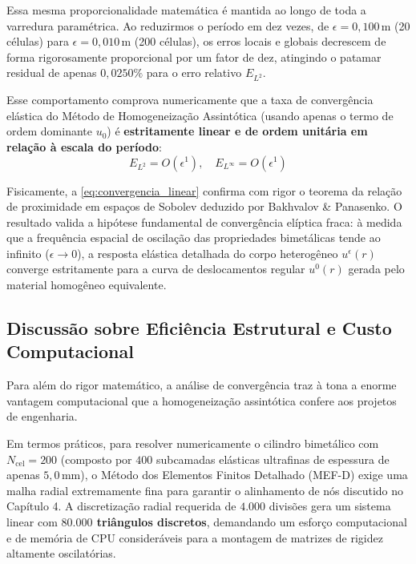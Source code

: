 Essa mesma proporcionalidade matemática é mantida ao longo de toda a varredura paramétrica. Ao reduzirmos o período em dez vezes, de $\epsilon = 0,100 \, \text{m}$ (20 células) para $\epsilon = 0,010 \, \text{m}$ (200 células), os erros locais e globais decrescem de forma rigorosamente proporcional por um fator de dez, atingindo o patamar residual de apenas \textbf{$0,0250\%$} para o erro relativo $E_{L^2}$.

Esse comportamento comprova numericamente que a taxa de convergência elástica do Método de Homogeneização Assintótica (usando apenas o termo de ordem dominante $u_0$) é \textbf{estritamente linear e de ordem unitária em relação à escala do período}:
\begin{equation}
  E_{L^2} = O(\epsilon^1) , \quad E_{L^\infty} = O(\epsilon^1)
  \label{eq:convergencia_linear}
\end{equation}

Fisicamente, a \eqref{eq:convergencia_linear} confirma com rigor o teorema da relação de proximidade em espaços de Sobolev deduzido por Bakhvalov \& Panasenko. O resultado valida a hipótese fundamental de convergência elíptica fraca: à medida que a frequência espacial de oscilação das propriedades bimetálicas tende ao infinito ($\epsilon \to 0$), a resposta elástica detalhada do corpo heterogêneo $u^\epsilon(r)$ converge estritamente para a curva de deslocamentos regular $u^0(r)$ gerada pelo material homogêneo equivalente.

\subsection{Discussão sobre Eficiência Estrutural e Custo Computacional}

Para além do rigor matemático, a análise de convergência traz à tona a enorme vantagem computacional que a homogeneização assintótica confere aos projetos de engenharia.

Em termos práticos, para resolver numericamente o cilindro bimetálico com $N_{\text{cel}} = 200$ (composto por $400$ subcamadas elásticas ultrafinas de espessura de apenas $5,0 \, \text{mm}$), o Método dos Elementos Finitos Detalhado (MEF-D) exige uma malha radial extremamente fina para garantir o alinhamento de nós discutido no Capítulo 4. A discretização radial requerida de $4.000$ divisões gera um sistema linear com \textbf{$80.000$ triângulos discretos}, demandando um esforço computacional e de memória de CPU consideráveis para a montagem de matrizes de rigidez altamente oscilatórias.


